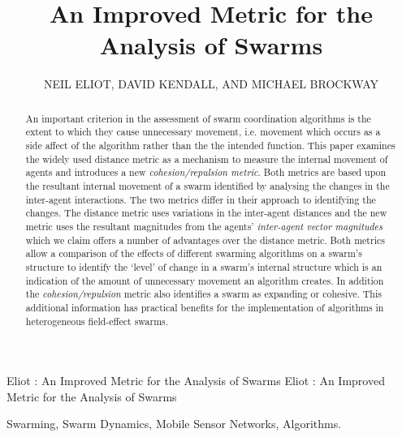 \documentclass{ieeeaccess}
\begin{document}

\title{An Improved Metric for the Analysis of Swarms}
\author{\uppercase{Neil Eliot},
\uppercase{David Kendall, and Michael Brockway}}
\address[1]{Northumbria University, Department of Computing and Information Sciences, 
Newcastle upon Tyne, NE1 8ST}

\markboth
{Eliot \headeretal: An Improved Metric for the Analysis of Swarms}
{Eliot \headeretal: An Improved Metric for the Analysis of Swarms}



\begin{abstract}
An important criterion in the assessment of swarm coordination algorithms is
the extent to which they cause unnecessary movement, i.e. movement which
occurs as a side affect of the algorithm rather than the the intended
function. This paper examines the widely used distance metric as a mechanism
to measure the internal movement of agents and introduces a new
\emph{cohesion/repulsion metric}.  Both metrics are based upon the resultant
internal movement of a swarm identified by analysing the changes in the
inter-agent interactions. The two metrics differ in their approach to
identifying the changes. The distance metric uses variations in the
inter-agent distances and the new metric uses the resultant magnitudes from
the agents' \emph{inter-agent vector magnitudes}  which we claim offers a
number of advantages over the distance metric.  Both metrics allow a
comparison of the effects of different swarming algorithms on a swarm's
structure to identify the `level' of change in a swarm's internal structure
which is an indication of the amount of unnecessary movement an algorithm
creates.  In addition the \emph{cohesion/repulsion} metric also identifies a
swarm as expanding or cohesive.  This additional information has practical
benefits for the implementation of algorithms in heterogeneous field-effect swarms.
\end{abstract}

\begin{keywords}
Swarming, Swarm Dynamics, Mobile Sensor Networks, Algorithms.
\end{keywords}


\titlepgskip=-15pt
\maketitle
\end{document}
